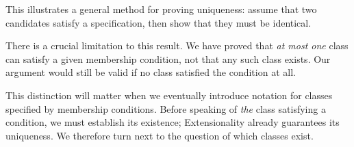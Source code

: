 This illustrates a general method for proving uniqueness: assume that two candidates satisfy a specification, then show that they must be identical.

 There is a crucial limitation to this result. We have proved that \textit{at most one} class can satisfy a given membership condition, not that any such class exists. Our argument would still be valid if no class satisfied the condition at all.

This distinction will matter when we eventually introduce notation for classes specified by membership conditions. Before speaking of \emph{the} class satisfying a condition, we must establish its existence; Extensionality already guarantees its uniqueness. We therefore turn next to the question of which classes exist.
